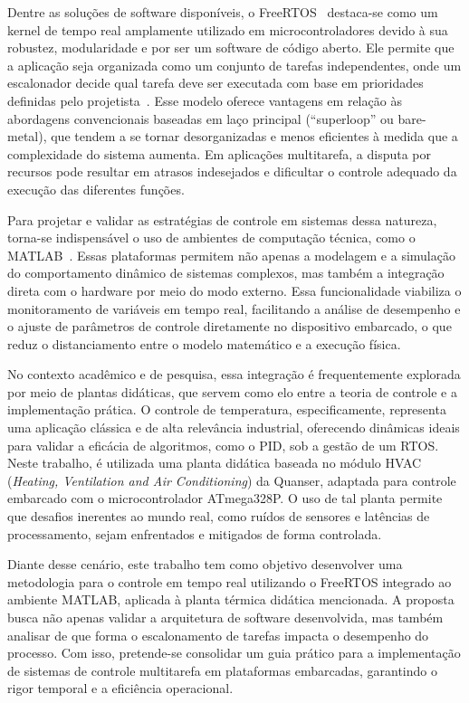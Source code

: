 \documentclass[repeatfields,xlists,xpacks,oneside]{ufrgscca}
\begin{document}
Dentre as soluções de software disponíveis, o FreeRTOS~\cite{aws2024freertos} destaca-se como um kernel
de tempo real amplamente utilizado em microcontroladores devido à sua robustez,
modularidade e por ser um software de código aberto. Ele permite que a aplicação
seja organizada como um conjunto de tarefas independentes, onde um escalonador
decide qual tarefa deve ser executada com base em prioridades definidas pelo
projetista~\cite{barry2016freertos}. Esse modelo oferece vantagens em relação às
abordagens convencionais baseadas em laço principal (``superloop'' ou bare-metal),
que tendem a se tornar desorganizadas e menos eficientes à medida que a complexidade
do sistema aumenta. Em aplicações multitarefa, a disputa por recursos pode resultar
em atrasos indesejados e dificultar o controle adequado da execução das diferentes funções.

Para projetar e validar as estratégias de controle em sistemas dessa natureza, torna-se
indispensável o uso de ambientes de computação técnica, como o MATLAB~\cite{mathworks_matlab}. Essas plataformas
permitem não apenas a modelagem e a simulação do comportamento dinâmico de sistemas complexos,
mas também a integração direta com o hardware por meio do modo externo. Essa funcionalidade
viabiliza o monitoramento de variáveis em tempo real, facilitando a análise de desempenho e o
ajuste de parâmetros de controle diretamente no dispositivo embarcado, o que reduz o distanciamento
entre o modelo matemático e a execução física.

No contexto acadêmico e de pesquisa, essa integração é frequentemente explorada por meio de plantas
didáticas, que servem como elo entre a teoria de controle e a implementação prática. O controle de
temperatura, especificamente, representa uma aplicação clássica e de alta relevância industrial,
oferecendo dinâmicas ideais para validar a eficácia de algoritmos, como o PID, sob a gestão de um RTOS.
Neste trabalho, é utilizada uma planta didática baseada no módulo HVAC (\textit{Heating, Ventilation
and Air Conditioning}) da Quanser, adaptada para controle embarcado com o microcontrolador ATmega328P.
O uso de tal planta permite que desafios inerentes ao mundo real, como ruídos de sensores e latências
de processamento, sejam enfrentados e mitigados de forma controlada.

Diante desse cenário, este trabalho tem como objetivo desenvolver uma metodologia para o controle
em tempo real utilizando o FreeRTOS integrado ao ambiente MATLAB, aplicada à planta térmica
didática mencionada. A proposta busca não apenas validar a arquitetura de software desenvolvida, mas também
analisar de que forma o escalonamento de tarefas impacta o desempenho do processo. Com isso,
pretende-se consolidar um guia prático para a implementação de sistemas de controle multitarefa em
plataformas embarcadas, garantindo o rigor temporal e a eficiência operacional.
\end{document}
